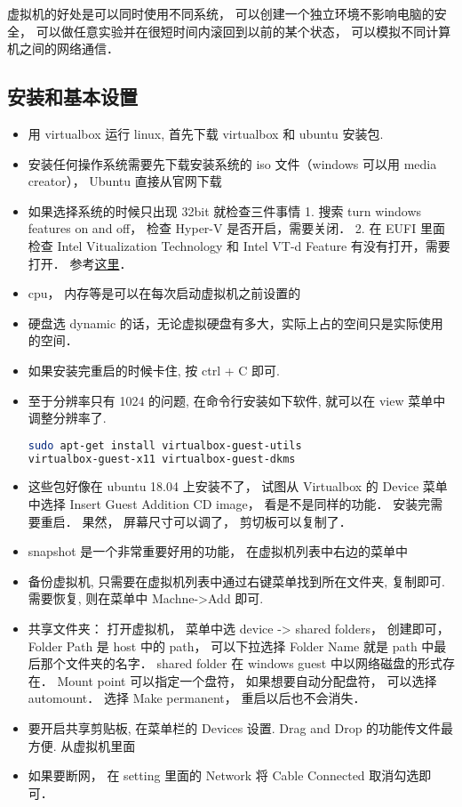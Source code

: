 
\begin{issues}
\issueDraft
\end{issues}

虚拟机的好处是可以同时使用不同系统， 可以创建一个独立环境不影响电脑的安全， 可以做任意实验并在很短时间内滚回到以前的某个状态， 可以模拟不同计算机之间的网络通信．

\subsection{安装和基本设置}

\begin{itemize}
\item 用 virtualbox 运行 linux, 首先下载 virtualbox 和 ubuntu 安装包.
\item 安装任何操作系统需要先下载安装系统的 iso 文件（windows 可以用 media creator）， Ubuntu 直接从官网下载
\item 如果选择系统的时候只出现 32bit 就检查三件事情 1. 搜索 turn windows features on and off， 检查 Hyper-V 是否开启，需要关闭． 2. 在 EUFI 里面检查 Intel Vitualization Technology 和 Intel VT-d Feature 有没有打开，需要打开． 参考\href{http://www.fixedbyvonnie.com/2014/11/virtualbox-showing-32-bit-guest-versions-64-bit-host-os/}{这里}．
\item cpu， 内存等是可以在每次启动虚拟机之前设置的
\item 硬盘选 dynamic 的话，无论虚拟硬盘有多大，实际上占的空间只是实际使用的空间．
\item 如果安装完重启的时候卡住, 按 ctrl + C 即可.
\item 至于分辨率只有 1024 的问题, 在命令行安装如下软件, 就可以在 view 菜单中调整分辨率了.
\begin{lstlisting}[language=bash]
sudo apt-get install virtualbox-guest-utils
virtualbox-guest-x11 virtualbox-guest-dkms
\end{lstlisting}
\item 这些包好像在 ubuntu 18.04 上安装不了， 试图从 Virtualbox 的 Device 菜单中选择 Insert Guest Addition CD image， 看是不是同样的功能． 安装完需要重启． 果然， 屏幕尺寸可以调了， 剪切板可以复制了．
\item snapshot 是一个非常重要好用的功能， 在虚拟机列表中右边的菜单中
\item 备份虚拟机, 只需要在虚拟机列表中通过右键菜单找到所在文件夹, 复制即可. 需要恢复, 则在菜单中 Machne->Add 即可.
\item 共享文件夹： 打开虚拟机， 菜单中选 device -> shared folders， 创建即可， Folder Path 是 host 中的 path， 可以下拉选择 Folder Name 就是 path 中最后那个文件夹的名字． shared folder 在 windows guest 中以网络磁盘的形式存在． Mount point 可以指定一个盘符， 如果想要自动分配盘符， 可以选择 automount． 选择 Make permanent， 重启以后也不会消失．
\item 要开启共享剪贴板, 在菜单栏的 Devices 设置. Drag and Drop 的功能传文件最方便. 从虚拟机里面
\item 如果要断网， 在 setting 里面的 Network 将 Cable Connected 取消勾选即可．
\end{itemize}

